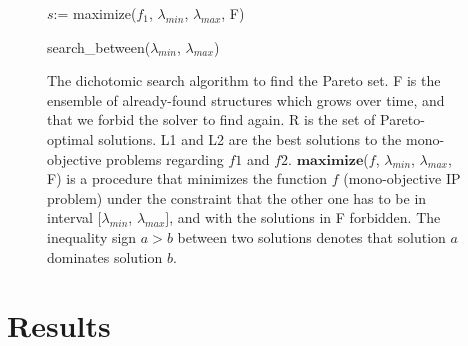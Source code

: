 \documentclass{bioinfo}
\begin{document}
\begin{methods}
\begin{figure}[!tbp]
\begin{algorithm}[H]
$s$:= maximize($f_1$, $\lambda_{min}$, $\lambda_{max}$, F)\;
\caption{search\_between($\lambda_{min}$, $\lambda_{max}$)}
\end{algorithm}

\caption{The dichotomic search algorithm to find the Pareto set. F is the ensemble of already-found structures which grows over time, and that we forbid the solver to find again. R is the set of Pareto-optimal solutions. L1 and L2 are the best solutions to the mono-objective problems regarding $f1$ and $f2$. $\mathbf{maximize}$($f$, $\lambda_{min}$, $\lambda_{max}$, F) is a procedure that minimizes the function $f$ (mono-objective IP problem) under the constraint that the other one has to be in interval $[\lambda_{min}$, $\lambda_{max}]$, and with the solutions in F forbidden. The inequality sign $a>b$ between two solutions denotes that solution $a$ dominates solution $b$.}\label{fig:findP}
\end{figure}

\end{methods}

\section{Results}\label{sec:results}
\end{document}
